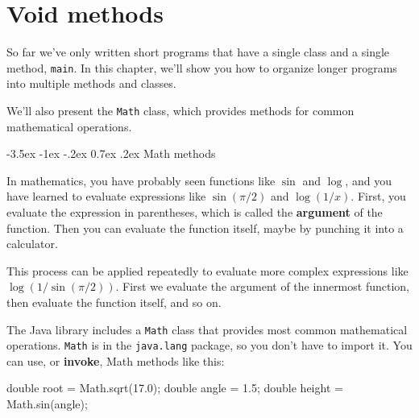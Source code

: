 \documentclass[12pt]{book}
\makeatletter
\theoremstyle{exercise}
\newcommand{\java}[1]{\verb"#1"}
\renewcommand{\section}{\@startsection{section}{1}{\z@}%
    {-3.5ex \@plus -1ex \@minus -.2ex}%
    {0.7ex \@plus.2ex}%
    {\normalfont\Large\bfseries}}
\newcommand{\java}[1]{\lstinline{#1}} %
\makeatother
\begin{document}
\chapter{Void methods}
\label{voidmeth}

So far we've only written short programs that have a single class and a single method, \java{main}.
In this chapter, we'll show you how to organize longer programs into multiple methods and classes.

We'll also present the \java{Math} class, which provides methods for common mathematical operations.




\section{Math methods}


In mathematics, you have probably seen functions like $\sin$ and $\log$, and you have learned to evaluate expressions like $\sin(\pi/2)$ and $\log(1/x)$.
First, you evaluate the expression in parentheses, which is called the {\bf argument} of the function.
Then you can evaluate the function itself, maybe by punching it into a calculator.

This process can be applied repeatedly to evaluate more complex expressions like $\log(1/\sin(\pi/2))$.
First we evaluate the argument of the innermost function, then evaluate the function itself, and so on.


The Java library includes a \java{Math} class that provides most common mathematical operations.
\java{Math} is in the \java{java.lang} package, so you don't have to import it.
You can use, or {\bf invoke}, Math methods like this:

\begin{code}
    double root = Math.sqrt(17.0);
    double angle = 1.5;
    double height = Math.sin(angle);
\end{code}
\end{document}
